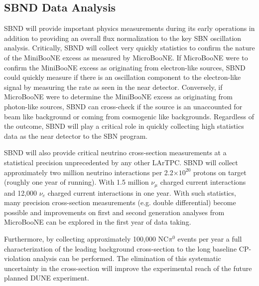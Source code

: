 \subsection{SBND Data Analysis}\label{sec:SBNDDataAnalysis}
SBND will provide important physics measurements during its early operations in addition to providing an overall flux normalization to the key SBN oscillation analysis. Critically, SBND will collect very quickly statistics to confirm the nature of the MiniBooNE excess as measured by MicroBooNE. If MicroBooNE were to confirm the MiniBooNE excess as originating from electron-like sources, SBND could quickly measure if there is an oscillation component to the electron-like signal by measuring the rate as seen in the near detector. Conversely, if MicroBooNE were to determine the MiniBooNE excess as originating from photon-like sources, SBND can cross-check if the source is an unaccounted for beam like background or coming from cosmogenic like backgrounds. Regardless of the outcome, SBND will play a critical role in quickly collecting high statistics data as the near detector to the SBN program.

SBND will also provide critical neutrino cross-section measurements at a statistical precision unprecedented by any other LArTPC. SBND will collect approximately two million neutrino interactions per 2.2$\times 10^{20}$ protons  on target (roughly one year of running). With 1.5 million $\nu_{\mu}$ charged current interactions and 12,000 $\nu_{e}$ charged current interactions in one year. With such statistics, many precision cross-section measurements (e.g. double differential) become possible and improvements on first and second generation analyses from MicroBooNE can be explored in the first year of data taking.

Furthermore, by collecting approximately 100,000 NC$\pi^{0}$ events per year a full characterization of the leading background cross-section to the long baseline CP-violation analysis can be performed. The elimination of this systematic uncertainty in the cross-section will improve the experimental reach of the future planned DUNE experiment.
